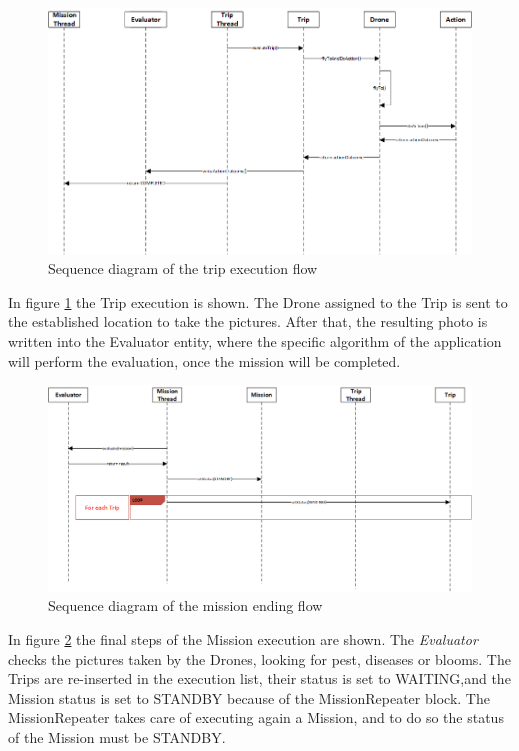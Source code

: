 \begin{figure}[h!]
  \centering
  \includegraphics[width=\linewidth]{pictures/Alfalfa_Sequence_TripExecution.png}
  \caption{Sequence diagram of the trip execution flow}
  \label{fig:alfalfaSequence3}
\end{figure}

In figure \ref{fig:alfalfaSequence3} the Trip execution is shown.
The Drone assigned to the Trip is sent to the established location to take the pictures.
After that, the resulting photo is written into the Evaluator entity, where the specific algorithm of the application will perform the evaluation, once the mission will be completed.
\\

\begin{figure}[h!]
  \centering
  \includegraphics[width=\linewidth]{pictures/Alfalfa_Sequence_MissionEnd.png}
  \caption{Sequence diagram of the mission ending flow}
  \label{fig:alfalfaSequence4}
\end{figure}

In figure \ref{fig:alfalfaSequence4} the final steps of the Mission execution are shown.
The \textit{Evaluator} checks the pictures taken by the Drones, looking for pest, diseases or blooms.
The Trips are re-inserted in the execution list, their status is set to WAITING,and the Mission status is set to STANDBY because of the MissionRepeater block.
The MissionRepeater takes care of executing again a Mission, and to do so the status of the Mission must be STANDBY.
\\

